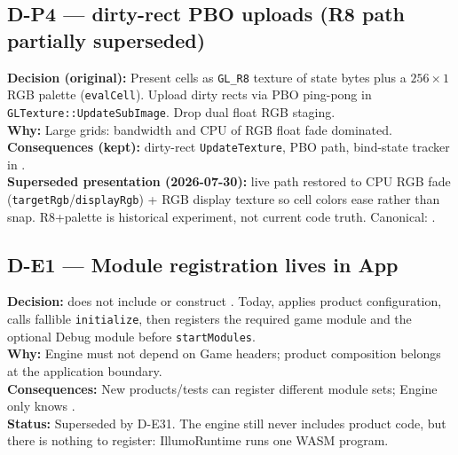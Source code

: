 \subsection*{D-P4 --- dirty-rect PBO uploads (R8 path partially superseded)}
\begin{decisionbox}[title={D-P4 \quad 2026-07-28}]
\textbf{Decision (original):} Present cells as \texttt{GL\_R8} texture of state
bytes plus a $256\times 1$ RGB palette (\texttt{evalCell}). Upload dirty rects
via PBO ping-pong in \texttt{GLTexture::UpdateSubImage}. Drop dual float RGB
staging.\\
\textbf{Why:} Large grids: bandwidth and CPU of RGB float fade dominated.\\
\textbf{Consequences (kept):} dirty-rect \texttt{UpdateTexture}, PBO path,
bind-state tracker in .\\
\textbf{Superseded presentation (2026-07-30):} live path restored to CPU RGB
fade (\texttt{targetRgb}/\texttt{displayRgb}) + RGB display texture so cell
colors ease rather than snap. R8+palette is historical experiment, not current
code truth. Canonical: .
\end{decisionbox}

\subsection*{D-E1 --- Module registration lives in App}
\begin{decisionbox}[title={D-E1 \quad 2026-07-28}]
\textbf{Decision:}  does not include or construct
. Today,
 applies product configuration,
calls fallible \texttt{initialize}, then registers the required game module and
the optional Debug module before \texttt{startModules}.\\
\textbf{Why:} Engine must not depend on Game headers; product composition
belongs at the application boundary.\\
\textbf{Consequences:} New products/tests can register different module sets;
Engine only knows .\\
\textbf{Status:} Superseded by D-E31. The engine still never includes product
code, but there is nothing to register: IllumoRuntime runs one WASM program.
\end{decisionbox}

